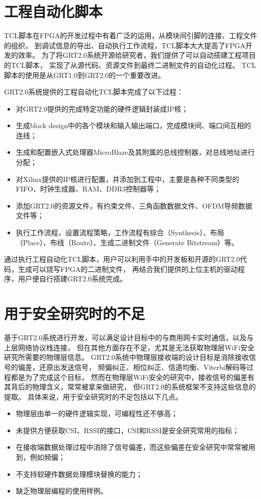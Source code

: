 	\section{工程自动化脚本}\label{sec:grt2.0_script}
	TCL脚本在FPGA的开发过程中有着广泛的运用\cite{xilinxtcl}，从模块间引脚的连接、工程文件的组织，
	到调试信息的导出、自动执行工作流程，TCL脚本大大提高了FPGA开发的效率。
	为了将GRT2.0系统开源给研究者，我们提供了可以自动搭建工程项目的TCL脚本，
	实现了从源代码、资源文件到最终二进制文件的自动化过程。
	TCL脚本的使用是从GRT1.0到GRT2.0的一个重要改进。

	GRT2.0系统提供的工程自动化TCL脚本完成了以下过程：
		\begin{itemize}
			\item 对GRT2.0提供的完成特定功能的硬件逻辑封装成IP核；
			\item 生成block design中的各个模块和输入输出端口，完成模块间、端口间互相的连线；
			\item 生成和配置嵌入式处理器MicroBlaze及其附属的总线控制器，对总线地址进行分配；
			\item 对Xilinx提供的IP核进行配置，并添加到工程中，主要是各种不同类型的FIFO、时钟生成器、RAM、DDR3控制器等；
			\item 添加GRT2.0的资源文件，有约束文件、三角函数数据文件、OFDM导频数据文件等；
			\item 执行工作流程，设置流程策略，工作流程有综合（Synthesis）、布局（Place）、布线（Route）、生成二进制文件（Generate Bitstream）等。
		\end{itemize}

	通过执行工程自动化TCL脚本，用户可以利用手中的开发板和开源的GRT2.0代码，生成可以烧写FPGA的二进制文件，
	再结合我们提供的上位主机的驱动程序，用户便自行搭建GRT2.0系统完成。

	\section{用于安全研究时的不足}\label{sec:grt2.0_drawback}
	基于GRT2.0系统进行开发，可以满足设计目标中的与商用网卡实时通信，以及与上层网络协议栈连接，
	但在其他方面存在不足，尤其是无法获取物理层WiFi安全研究所需要的物理层信息。
	GRT2.0系统中物理层接收端的设计目标是消除接收信号的偏差，还原出发送信号，
	频偏纠正、相位纠正、信道均衡、Viterbi解码等过程都是为了完成这个目标，
	然而在物理层WiFi安全的研究中，接收信号的偏差有其背后的物理含义，常常被拿来做研究，
	但GRT2.0的系统框架不支持这些信息的提取。
	具体来说，用于安全研究时的不足包括以下几点。
		\begin{itemize}
			\item 物理层由单一的硬件逻辑实现，可编程性还不够高；
			\item 未提供方便获取CSI、RSSI的接口，CSI和RSSI是安全研究常用的指标；
			\item 在接收端数据处理过程中消除了信号偏差，而这些偏差在安全研究中常常被用到，例如频偏；
			\item 不支持软硬件数据处理模块替换的能力；
			\item 缺乏物理层编程的使用样例。
		\end{itemize}

